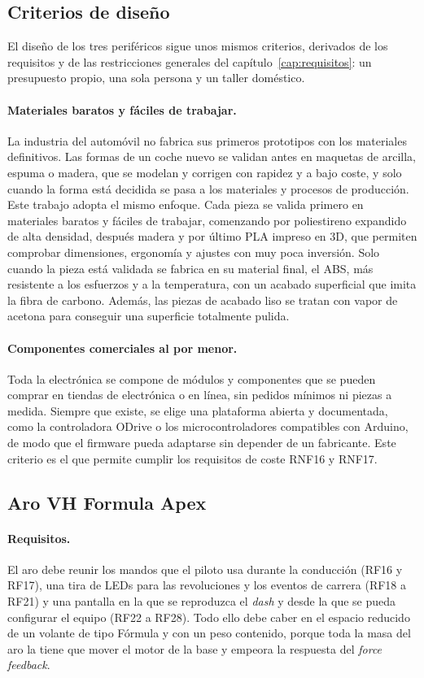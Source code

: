 \subsection{Criterios de diseño}
\label{subsec:criterios-diseno}
El diseño de los tres periféricos sigue unos mismos criterios, derivados de los requisitos y de las restricciones generales del capítulo~\ref{cap:requisitos}: un presupuesto propio, una sola persona y un taller doméstico.

\paragraph{Materiales baratos y fáciles de trabajar.}
La industria del automóvil no fabrica sus primeros prototipos con los materiales definitivos. Las formas de un coche nuevo se validan antes en maquetas de arcilla, espuma o madera, que se modelan y corrigen con rapidez y a bajo coste, y solo cuando la forma está decidida se pasa a los materiales y procesos de producción. Este trabajo adopta el mismo enfoque. Cada pieza se valida primero en materiales baratos y fáciles de trabajar, comenzando por poliestireno expandido de alta densidad, después madera y por último PLA impreso en 3D, que permiten comprobar dimensiones, ergonomía y ajustes con muy poca inversión. Solo cuando la pieza está validada se fabrica en su material final, el ABS, más resistente a los esfuerzos y a la temperatura, con un acabado superficial que imita la fibra de carbono. Además, las piezas de acabado liso se tratan con vapor de acetona para conseguir una superficie totalmente pulida.

\paragraph{Componentes comerciales al por menor.}
Toda la electrónica se compone de módulos y componentes que se pueden comprar en tiendas de electrónica o en línea, sin pedidos mínimos ni piezas a medida. Siempre que existe, se elige una plataforma abierta y documentada, como la controladora ODrive o los microcontroladores compatibles con Arduino, de modo que el firmware pueda adaptarse sin depender de un fabricante. Este criterio es el que permite cumplir los requisitos de coste RNF16 y RNF17.

\subsection{Aro VH Formula Apex}
\label{subsec:diseno-aro}
\paragraph{Requisitos.}
El aro debe reunir los mandos que el piloto usa durante la conducción (RF16 y RF17), una tira de LEDs para las revoluciones y los eventos de carrera (RF18 a RF21) y una pantalla en la que se reproduzca el \textit{dash} y desde la que se pueda configurar el equipo (RF22 a RF28). Todo ello debe caber en el espacio reducido de un volante de tipo Fórmula y con un peso contenido, porque toda la masa del aro la tiene que mover el motor de la base y empeora la respuesta del \textit{force feedback}.

